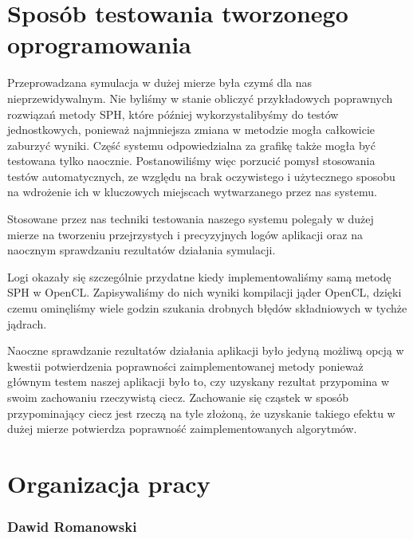 \documentclass[polish, 12pt]{aghthesis}
\begin{document}
\section{Sposób testowania tworzonego oprogramowania}

	Przeprowadzana symulacja w dużej mierze była czymś dla nas nieprzewidywalnym. Nie byliśmy w stanie obliczyć przykładowych poprawnych rozwiązań metody SPH, które później wykorzystalibyśmy do testów jednostkowych, ponieważ najmniejsza zmiana w metodzie mogła całkowicie zaburzyć wyniki. Część systemu odpowiedzialna za grafikę także mogła być testowana tylko naocznie. Postanowiliśmy więc porzucić pomysł stosowania testów automatycznych, ze względu na brak oczywistego i użytecznego sposobu na wdrożenie ich w kluczowych miejscach wytwarzanego przez nas systemu.
	 
	 Stosowane przez nas techniki testowania naszego systemu polegały w dużej mierze na tworzeniu przejrzystych i precyzyjnych logów aplikacji oraz na naocznym sprawdzaniu rezultatów działania symulacji. 
	 
	 Logi okazały się szczególnie przydatne kiedy implementowaliśmy samą metodę SPH w OpenCL. Zapisywaliśmy do nich wyniki kompilacji jąder OpenCL, dzięki czemu ominęliśmy wiele godzin szukania drobnych błędów składniowych w tychże jądrach. 
	 
	 Naoczne sprawdzanie rezultatów działania aplikacji było jedyną możliwą opcją w kwestii potwierdzenia poprawności zaimplementowanej metody ponieważ głównym testem naszej aplikacji było to, czy uzyskany rezultat przypomina w swoim zachowaniu rzeczywistą ciecz. Zachowanie się cząstek w sposób przypominający ciecz jest rzeczą na tyle złożoną, że uzyskanie takiego efektu w dużej mierze potwierdza poprawność zaimplementowanych algorytmów. 
	 

\section{Organizacja pracy}

\subsubsection*{Dawid Romanowski} 
		
\end{document}
